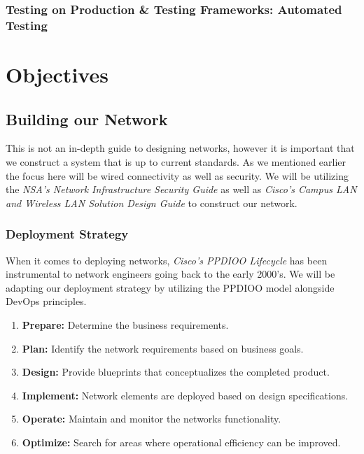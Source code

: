\documentclass[12pt, letterpaper]{article}
\begin{document}
\subsubsection{Testing on Production \& Testing Frameworks: Automated Testing}




\newpage

\section{Objectives}

	\subsection{Building our Network}
This is not an in-depth guide to designing networks, however it is important that we construct a system that is up to current standards. As we mentioned earlier the focus here will be wired connectivity as well as security. We will be utilizing the \textit{NSA’s Network Infrastructure Security Guide} as well as \textit{Cisco’s Campus LAN and Wireless LAN Solution Design Guide} to construct our network.

	\subsubsection{Deployment Strategy}

When it comes to deploying networks, \textit{Cisco's PPDIOO Lifecycle} has been instrumental to network engineers going back to the early 2000's. We will be adapting our deployment strategy by utilizing the PPDIOO model alongside DevOps principles.

\smallskip

\begin{enumerate}
\item \textbf{Prepare:} Determine the business requirements.
\item \textbf{Plan:} Identify the network requirements based on business goals.
\item \textbf{Design:} Provide blueprints that conceptualizes the completed product.
\item \textbf{Implement:} Network elements are deployed based on design specifications.
\item \textbf{Operate:} Maintain and monitor the networks functionality.
\item \textbf{Optimize:} Search for areas where operational efficiency can be improved.
\end{enumerate}
\end{document}
